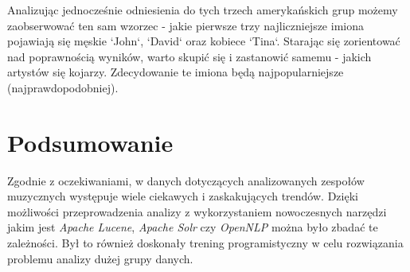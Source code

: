 \documentclass[journal]{article}
\begin{document}
 \renewcommand{\namefile}{../Lucene_project/results/cat_name/cat_name_American_blues_rock.csv}
 \renewcommand{\titleplot}{Najcześciej występujące imiona i nazwiska dla grupy 'American blues rock'}
 \renewcommand{\column}{Name}
 \renewcommand{\labx}{Imiona i nazwiska}
 \renewcommand{\laby}{Wystąpienia}
 
 \renewcommand{\namefile}{../Lucene_project/results/cat_name/cat_name_American_blues.csv}
 \renewcommand{\titleplot}{Najcześciej występujące imiona i nazwiska dla grupy 'American blues'}
 
 \renewcommand{\namefile}{../Lucene_project/results/cat_name/cat_name_American_instrumental.csv}
 \renewcommand{\titleplot}{Najcześciej występujące imiona i nazwiska dla grupy 'American instrumental'}
 
Analizując jednocześnie odniesienia do tych trzech amerykańskich grup możemy zaobserwować ten sam wzorzec -
 jakie pierwsze trzy najliczniejsze imiona pojawiają się męskie `John`, `David` oraz kobiece `Tina`.
Starając się zorientować nad poprawnością wyników, warto skupić się i zastanowić samemu -
jakich artystów się kojarzy. Zdecydowanie te imiona będą najpopularniejsze (najprawdopodobniej).

\section{Podsumowanie}
Zgodnie z oczekiwaniami, w danych dotyczących analizowanych zespołów muzycznych
 występuje wiele ciekawych i zaskakujących trendów. Dzięki możliwości przeprowadzenia
analizy z wykorzystaniem nowoczesnych narzędzi jakim jest \textit{Apache Lucene},
\textit{Apache Solr} czy \textit{OpenNLP} można było zbadać te zależności.
Był to również doskonały trening programistyczny w celu rozwiązania problemu analizy dużej grupy danych.
\end{document}
